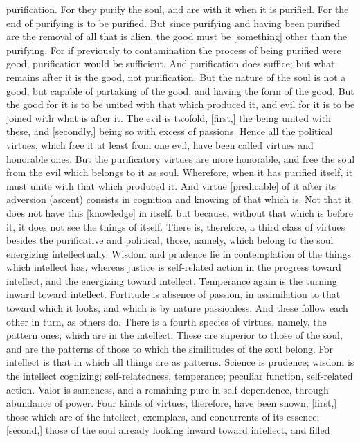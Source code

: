 \documentclass[12pt]{article}
\begin{document}
purification. For they purify the soul, and are with it when it is purified.
For the end of purifying is to be purified. But since purifying and having been
purified are the removal of all that is alien, the good must be [something]
other than the purifying. For if previously to contamination the process of
being purified were good, purification would be sufficient. And purification
does suffice; but what remains after it is the good, not purification. But the
nature of the soul is not a good, but capable of partaking of the good, and
having the form of the good. But the good for it is to be united with that
which produced it, and evil for it is to be joined with what is after it. The
evil is twofold, [first,] the being united with these, and [secondly,] being so
with excess of passions. Hence all the political virtues, which free it at
least from one evil, have been called virtues and honorable ones. But the
purificatory virtues are more honorable, and free the soul from the evil which
belongs to it as soul. Wherefore, when it has purified itself, it must unite
with that which produced it. And virtue [predicable] of it after its adversion
(ascent) consists in cognition and knowing of that which is. Not that it does
not have this [knowledge] in itself, but because, without that which is before
it, it does not see the things of itself. There is, therefore, a third class of
virtues besides the purificative and political, those, namely, which belong to
the soul energizing intellectually. Wisdom and prudence lie in contemplation of
the things which intellect has, whereas justice is self-related action in the
progress toward intellect, and the energizing toward intellect. Temperance
again is the turning inward toward intellect. Fortitude is absence of passion,
in assimilation to that toward which it looks, and which is by nature
passionless. And these follow each other in turn, as others do. There is a
fourth species of virtues, namely, the pattern ones, which are in the
intellect. These are superior to those of the soul, and are the patterns of
those to which the similitudes of the soul belong. For intellect is that in
which all things are as patterns. Science is prudence; wisdom is the intellect
cognizing; self-relatedness, temperance; peculiar function, self-related
action. Valor is sameness, and a remaining pure in self-dependence, through
abundance of power. Four kinds of virtues, therefore, have been shown; [first,]
those which are of the intellect, exemplars, and concurrents of its essence;
[second,] those of the soul already looking inward toward intellect, and filled
\end{document}
